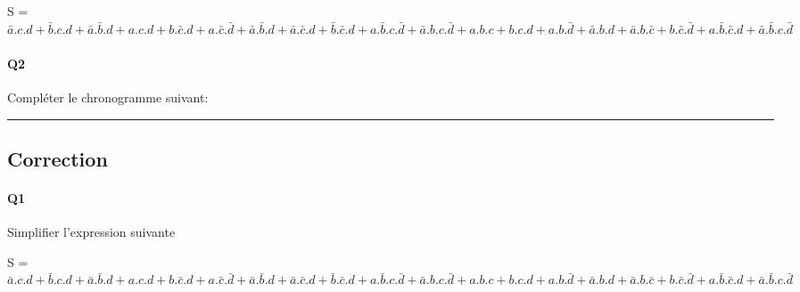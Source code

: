 S = $ \bar a.c.d + \bar b.c.d + \bar a.\bar b.d  +  a.c.d + b.\bar c.d + a.\bar c.\bar d  +  \bar a.\bar b.d + \bar a.\bar c.d + \bar b.\bar c.d + a.\bar b.c.\bar d + \bar a.b.c.\bar d  +  a.b.c + b.c.d + a.b.\bar d + \bar a.b.d + \bar a.b.\bar c + b.\bar c.\bar d + a.\bar b.\bar c.d + \bar a.\bar b.c.\bar d $


\paragraph{Q2}

Compléter le chronogramme suivant:

 





\hrule width 1\linewidth
\pagebreak

\subsection{Correction}


\paragraph{Q1}

Simplifier l'expression suivante

S = $ \bar a.c.d + \bar b.c.d + \bar a.\bar b.d  +  a.c.d + b.\bar c.d + a.\bar c.\bar d  +  \bar a.\bar b.d + \bar a.\bar c.d + \bar b.\bar c.d + a.\bar b.c.\bar d + \bar a.b.c.\bar d  +  a.b.c + b.c.d + a.b.\bar d + \bar a.b.d + \bar a.b.\bar c + b.\bar c.\bar d + a.\bar b.\bar c.d + \bar a.\bar b.c.\bar d $

